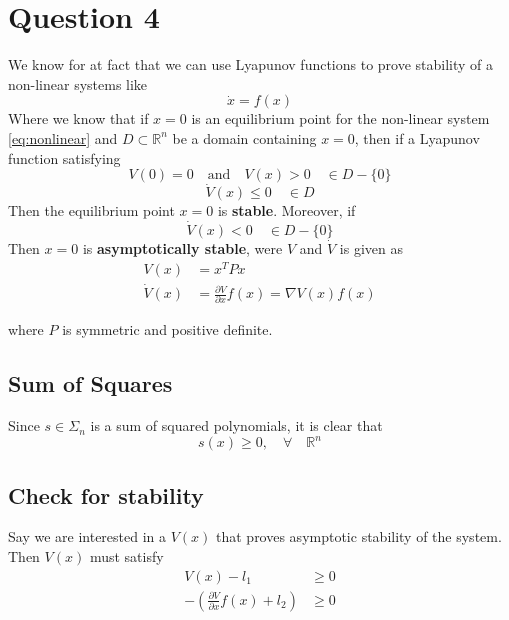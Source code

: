\chapter{Question 4}
  We know for at fact that we can use Lyapunov functions to prove stability of a
non-linear systems like
\begin{equation}
        \dot{x} = f(x)
        \label{eq:nonlinear}
\end{equation}
Where we know that if $x = 0$ is an equilibrium point for the non-linear system \eqref{eq:nonlinear} and
$D \subset \mathbb{R}^n$ be a domain containing $x = 0$, then if a Lyapunov function satisfying
\begin{equation}
        V(0) = 0 \quad \text{and} \quad V(x) > 0 \quad \in D - \{0\}
\end{equation}
\begin{equation}
        \dot{V}(x) \leq 0 \quad \in D
\end{equation}
Then the equilibrium point $x = 0$ is \textbf{stable}. Moreover, if
\begin{equation}
        \dot{V}(x) < 0 \quad \in D - \{0\}
\end{equation}
Then $x = 0$ is \textbf{asymptotically stable}, were $V$ and $\dot{V}$ is given as
\begin{equation}
  \begin{split}
    V(x) &= x^T P x \\
    \dot{V}(x) &= \frac{\partial V}{\partial x} f(x) = \nabla V(x) f(x)
  \end{split}
\end{equation}

where $P$ is symmetric and positive definite.

\section*{Sum of Squares}
Since $s \in \Sigma_{n}$ is a sum of squared polynomials, it is clear that 
\begin{equation}
        s(x) \geq 0, \quad \forall \quad \mathbb{R}^n
\end{equation}

\section*{Check for stability}
Say we are interested in a $V(x)$ that proves asymptotic stability of the system. Then $V(x)$ must satisfy
\begin{equation}
        \begin{split}
                V(x) - l_1 & \geq 0 \\
                -\left(\frac{\partial V}{\partial x} f(x) + l_2 \right) &\geq 0
        \end{split}
\end{equation}

